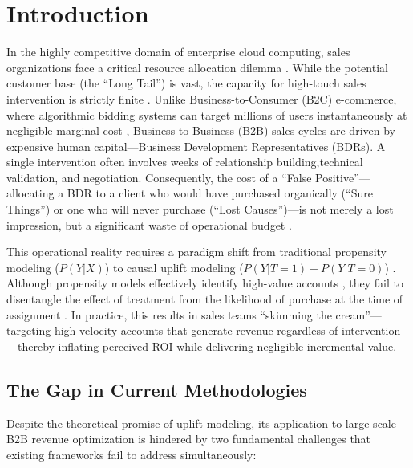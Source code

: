 \documentclass[runningheads]{llncs}
\begin{document}
\section{Introduction}
In the highly competitive domain of enterprise cloud computing, sales organizations face a critical resource allocation dilemma \cite{reutterer2006dynamic}. While the potential customer base (the ``Long Tail'') is vast, the capacity for high-touch sales intervention is strictly finite  \cite{zhang2021unified,gutierrez2017causal,goldenberg2020free,albert2021commerce}. Unlike Business-to-Consumer (B2C) e-commerce, where algorithmic bidding systems can target millions of users instantaneously at negligible marginal cost \cite{zhang2021unified,devriendt2020learning}, Business-to-Business (B2B) sales cycles are driven by expensive human capital—Business Development Representatives (BDRs). A single intervention often involves weeks of relationship building,technical validation, and negotiation. Consequently, the cost of a ``False Positive''—allocating a BDR to a client who would have purchased organically (``Sure Things'') or one who will never purchase (``Lost Causes'')—is not merely a lost impression, but a significant waste of operational budget \cite{efin2023,goldenberg2020free,albert2021commerce,zhou2023direct}.

This operational reality requires a paradigm shift from traditional propensity modeling ($P(Y|X)$) to causal uplift modeling ($P(Y|T=1) - P(Y|T=0)$) \cite{reutterer2006dynamic,zhang2021unified,gutierrez2017causal,curth2021nonparametric}. Although propensity models effectively identify high-value accounts \cite{kane2014mining}, they fail to disentangle the effect of treatment from the likelihood of purchase at the time of assignment \cite{yao2018representation,louizos2017causal,curth2021nonparametric,athey2015machine}. In practice, this results in sales teams ``skimming the cream''—targeting high-velocity accounts that generate revenue regardless of intervention—thereby inflating perceived ROI while delivering negligible incremental value.

\subsection{The Gap in Current Methodologies}
Despite the theoretical promise of uplift modeling, its application to large-scale B2B revenue optimization is hindered by two fundamental challenges that existing frameworks fail to address simultaneously:
\end{document}
